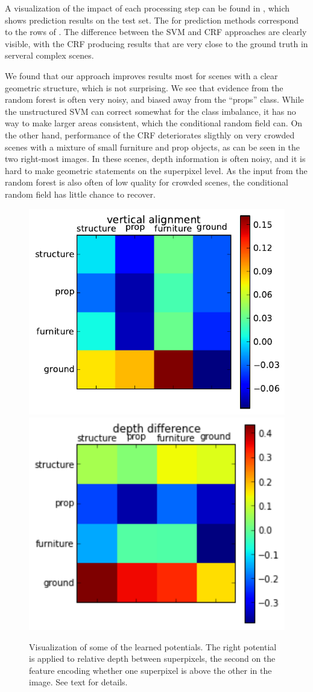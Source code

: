 \documentclass[a4paper, 10pt, conference]{ieeeconf}      %
\begin{document}
A visualization of the impact of each processing step can be found in
, which shows prediction results on the test set.  The for
prediction methods correspond to the rows of .  The difference
between the SVM and CRF approaches are clearly visible, with the CRF producing
results that are very close to the ground truth in serveral complex scenes.

We found that our approach improves results most for scenes with a clear geometric structure,
which is not surprising. We see that evidence from the random forest is often very noisy, and biased
away from the ``props'' class. While the unstructured SVM can correct somewhat
for the class imbalance, it has no way to make larger areas consistent, which
the conditional random field can.
On the other hand, performance of the CRF deteriorates sligthly on very crowded
scenes with a mixture of small furniture and prop objects, as
can be seen in the two right-most images. In these scenes, depth information is
often noisy, and it is hard to make geometric statements on the superpixel
level. As the input from the random forest is also often of low quality for
crowded scenes, the conditional random field has little chance to recover.

\begin{figure}
    \begin{center}
        \includegraphics[width=.45\linewidth]{images/vertical_alignment}\vspace{1mm}
    \includegraphics[width=.45\linewidth]{images/depth_difference}
    \end{center}
    \caption{%
        Visualization of some of the learned potentials. The right potential is
        applied to relative depth between superpixels, the second on the
        feature encoding whether one superpixel is above the other in the
        image. See text for details.
    }
\end{figure}
\end{document}
